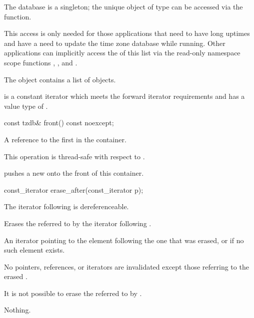 \pnum
The  database is a singleton;
the unique object of type  can be
accessed via the  function.
\begin{note}
This access is only needed for those applications
that need to have long uptimes and
have a need to update the time zone database while running.
Other applications can implicitly access the  of this list
via the read-only namespace scope functions
,
, and
.
\end{note}
The  object contains a list of  objects.

\pnum
{} is a constant iterator
which meets the forward iterator requirements
and has a value type of .

%
\begin{itemdecl}
const tzdb& front() const noexcept;
\end{itemdecl}

\begin{itemdescr}
\pnum
\returns
A reference to the first  in the container.

\pnum
\remarks
This operation is thread-safe with respect to .
\begin{note}
 pushes a new 
onto the front of this container.
\end{note}
\end{itemdescr}

%
\begin{itemdecl}
const_iterator erase_after(const_iterator p);
\end{itemdecl}

\begin{itemdescr}
\pnum
\requires
The iterator following  is dereferenceable.

\pnum
\effects
Erases the  referred to by the iterator following .

\pnum
\returns
An iterator pointing to the element following the one that was erased,
or  if no such element exists.

\pnum
\remarks
No pointers, references, or iterators are invalidated
except those referring to the erased .
\begin{note}
It is not possible to erase the 
referred to by .
\end{note}

\pnum
\throws Nothing.
\end{itemdescr}

